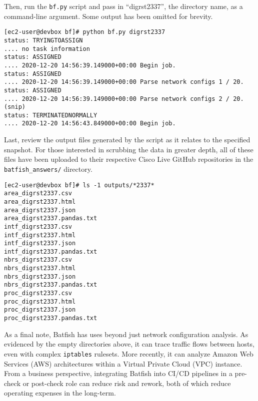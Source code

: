 Then, run the \verb|bf.py| script and pass in ``digrst2337'', the directory
name, as a command-line argument. Some output has been omitted for brevity.

\begin{verbatim}
[ec2-user@devbox bf]# python bf.py digrst2337
status: TRYINGTOASSIGN
.... no task information
status: ASSIGNED
.... 2020-12-20 14:56:39.149000+00:00 Begin job.
status: ASSIGNED
.... 2020-12-20 14:56:39.149000+00:00 Parse network configs 1 / 20.
status: ASSIGNED
.... 2020-12-20 14:56:39.149000+00:00 Parse network configs 2 / 20.
(snip)
status: TERMINATEDNORMALLY
.... 2020-12-20 14:56:43.849000+00:00 Begin job.
\end{verbatim}

Last, review the output files generated by the script as it relates to
the specified snapshot. For those interested in scrubbing the data in
greater depth, all of these files have been uploaded to their respective
Cisco Live GitHub repositories in the \verb|batfish_answers/| directory.

\begin{verbatim}
[ec2-user@devbox bf]# ls -1 outputs/*2337*
area_digrst2337.csv
area_digrst2337.html
area_digrst2337.json
area_digrst2337.pandas.txt
intf_digrst2337.csv
intf_digrst2337.html
intf_digrst2337.json
intf_digrst2337.pandas.txt
nbrs_digrst2337.csv
nbrs_digrst2337.html
nbrs_digrst2337.json
nbrs_digrst2337.pandas.txt
proc_digrst2337.csv
proc_digrst2337.html
proc_digrst2337.json
proc_digrst2337.pandas.txt
\end{verbatim}

As a final note, Batfish has uses beyond just network configuration analysis.
As evidenced by the empty directories above, it can trace traffic flows between
hosts, even with complex \verb|iptables| rulesets. More recently, it can
analyze Amazon Web Services (AWS) architectures within a Virtual Private
Cloud (VPC) instance. From a business perspective, integrating Batfish into
CI/CD pipelines in a pre-check or post-check role can reduce risk and rework,
both of which reduce operating expenses in the long-term.
